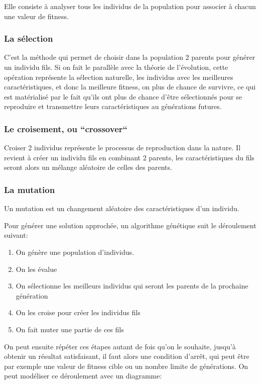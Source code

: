 \documentclass[11pt]{article}
\begin{document}
Elle consiste à analyser tous les individus de la population pour associer à chacun une valeur de fitness.

\subsubsection{La sélection}

C'est la méthode qui permet de choisir dans la population 2 parents pour générer un individu fils.
Si on fait le parallèle avec la théorie de l'évolution, cette opération représente la sélection naturelle,
les individus avec les meilleures caractéristiques, et donc la meilleure fitness, on plus de chance de survivre,
ce qui est matérialisé par le fait qu'ils ont plus de chance d'être sélectionnés pour se reproduire et transmettre
leurs caractéristiques au générations futures.

\subsubsection{Le croisement, ou ``crossover``}

Croiser 2 individus représente le processus de reproduction dans la nature. Il revient à créer un individu fils
en combinant 2 parents, les caractéristiques du fils seront alors un mélange aléatoire de celles des parents.

\subsubsection{La mutation}

Un mutation est un changement aléatoire des caractéristiques d'un individu. 

Pour générer une solution approchée, un algorithme génétique suit le déroulement suivant:

\begin{enumerate}
\item On génère une population d'individus.
\item On les évalue
\item On sélectionne les meilleurs individus qui seront les parents de la prochaine génération
\item On les croise pour créer les individus fils
\item On fait muter une partie de ces fils
\end{enumerate}

On peut ensuite répéter ces étapes autant de fois qu'on le souhaite, jusqu'à obtenir un résultat satisfaisant,
il faut alors une condition d'arrêt, qui peut être par exemple une valeur de fitness cible ou un nombre limite de générations.
On peut modéliser ce déroulement avec un diagramme:
\end{document}
